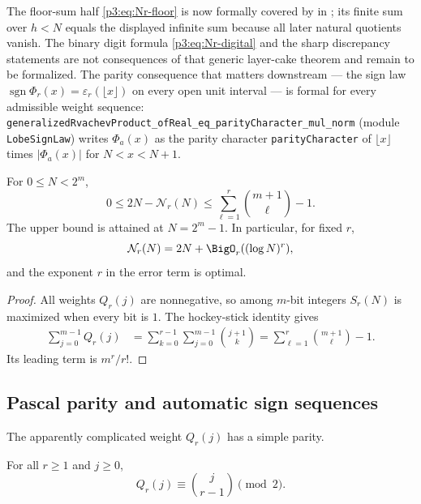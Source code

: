 \documentclass[11pt,oneside]{article}
\theoremstyle{definition}
\theoremstyle{remark}
\newcommand{\lean}[1]{%
  \ifmmode\text{\texttt{\detokenize{#1}}}\else\nolinkurl{#1}\fi}
\newcommand{\decl}[1]{\nolinkurl{#1}}
\begin{document}
The floor-sum half \eqref{p3:eq:Nr-floor} is now formally covered by
 in
; its finite sum over $h<N$ equals the
displayed infinite sum because all later natural quotients vanish.  The
binary digit formula \eqref{p3:eq:Nr-digital} and the sharp discrepancy
statements are not consequences of that generic layer-cake theorem and remain
to be formalized.  The parity consequence that matters downstream --- the sign
law $\operatorname{sgn}\Phi_r(x)=\varepsilon_r(\lfloor x\rfloor)$ on every
open unit interval --- is formal for every admissible weight sequence:
\decl{generalizedRvachevProduct_ofReal_eq_parityCharacter_mul_norm} (module
\lean{LobeSignLaw}) writes $\Phi_a(x)$ as the parity character
\decl{parityCharacter} of $\lfloor x\rfloor$ times $|\Phi_a(x)|$ for
$N<x<N+1$.

\begin{corollary}\label{p3:cor:discrepancy-range}
For $0\le N<2^m$,
\begin{equation}\label{p3:eq:discrepancy-bound}
 0\le 2N-\mathcal N_r(N)
 \le \sum_{\ell=1}^{r}\binom{m+1}{\ell}-1.
\end{equation}
The upper bound is attained at $N=2^m-1$.  In particular, for fixed $r$,
\[
  \mathcal N_r(N)=2N+\BigO_r((\log N)^r),
\]
and the exponent $r$ in the error term is optimal.
\end{corollary}

\begin{proof}
All weights $Q_r(j)$ are nonnegative, so among $m$-bit integers $S_r(N)$ is maximized when every bit is $1$.  The hockey-stick identity gives
\begin{align*}
 \sum_{j=0}^{m-1}Q_r(j)
 &=\sum_{k=0}^{r-1}\sum_{j=0}^{m-1}\binom{j+1}{k}
 =\sum_{\ell=1}^{r}\binom{m+1}{\ell}-1.
\end{align*}
Its leading term is $m^r/r!$.
\end{proof}

\subsection{Pascal parity and automatic sign sequences}

The apparently complicated weight $Q_r(j)$ has a simple parity.

\begin{lemma}\label{p3:lem:parity-collapse}
For all $r\ge1$ and $j\ge0$,
\begin{equation}\label{p3:eq:parity-collapse}
  Q_r(j)\equiv\binom j{r-1}\pmod2.
\end{equation}
\end{lemma}
\end{document}
